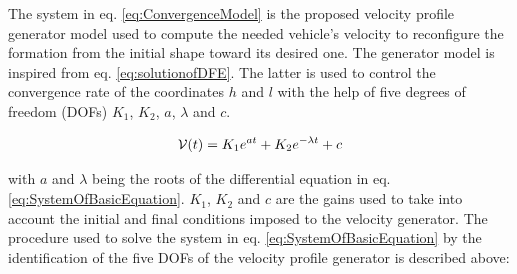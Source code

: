 The system in eq. \ref{eq:ConvergenceModel} is the proposed velocity profile generator model used to compute the needed vehicle's velocity to reconfigure the formation from the initial shape toward its desired one. The generator model is inspired from eq. \ref{eq:solutionofDFE}. The latter is used to control the convergence rate of the coordinates $h$ and $l$ with the help of five degrees of freedom (DOFs) $K_1$, $K_2$, $a$, $\lambda$ and $c$.




\begin{equation} \label{eq:ConvergenceModel}
    \mathcal{V}(t) = K_1 e^{a t} + K_2 e^{-\lambda t} + c \\
\end{equation}

 \noindent with $a$ and $\lambda$ being the roots of the differential equation in eq. \ref{eq:SystemOfBasicEquation}. $K_1$, $K_2$ and $c$ are the gains used to take into account the initial and final conditions imposed to the velocity generator. The procedure used to solve the system in eq. \ref{eq:SystemOfBasicEquation} by the identification of the five DOFs of the velocity profile generator is described above: 

